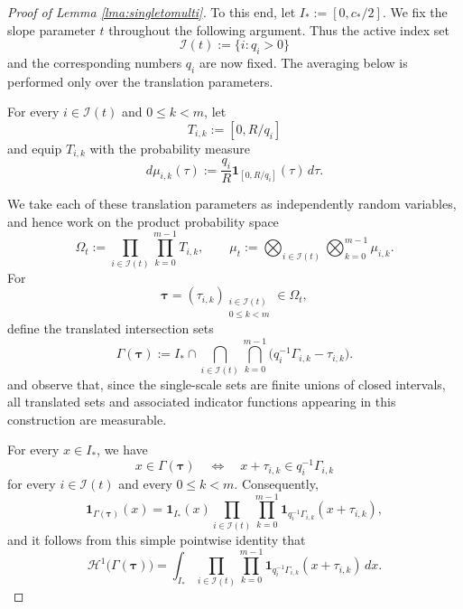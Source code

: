 \documentclass[12pt]{amsart}
\numberwithin{equation}{section}
\begin{document}
\begin{proof}[Proof of Lemma \ref{lma:singletomulti}]
To this end, let $I_*:=[0,c_*/2]$.  We fix the slope parameter $t$ throughout the following argument.  Thus the active index set
\[
\mathcal I(t):=\{i:q_i>0\}
\]
and the corresponding numbers $q_i$ are now fixed.  The averaging below is performed only over the translation parameters.

For every $i\in\mathcal I(t)$ and $0\leq k<m$, let
\[
T_{i,k}:=[0,R/q_i]
\]
and equip $T_{i,k}$ with the probability measure
\[
d\mu_{i,k}(\tau)
:=
\frac{q_i}{R}\mathbf 1_{[0,R/q_i]}(\tau)\,d\tau.
\]

We take each of these translation parameters as independently random variables, and hence work on the product probability space
\[
\Omega_t
:=
\prod_{i\in\mathcal I(t)}
\prod_{k=0}^{m-1}T_{i,k},
\qquad
\mu_t
:=
\bigotimes_{i\in\mathcal I(t)}
\bigotimes_{k=0}^{m-1}\mu_{i,k}.
\]
For
\[
\boldsymbol{\tau}
=
(\tau_{i,k})_{\substack{i\in\mathcal I(t)\\0\leq k<m}}
\in\Omega_t,
\]
define the translated intersection sets
\[
\Gamma(\boldsymbol{\tau})
:=
I_*\cap
\bigcap_{i\in\mathcal I(t)}
\bigcap_{k=0}^{m-1}
\bigl(q_i^{-1}\Gamma_{i,k}-\tau_{i,k}\bigr).
\]
and observe that, since the single-scale sets are finite unions of closed intervals, all translated sets and associated indicator functions appearing in this construction are measurable.  

For every $x\in I_*$, we have
\[
x\in\Gamma(\boldsymbol{\tau})
\quad\Longleftrightarrow\quad
x+\tau_{i,k}\in q_i^{-1}\Gamma_{i,k}
\]
for every $i\in\mathcal I(t)$ and every $0\leq k<m$.  Consequently,
\[
\mathbf 1_{\Gamma(\boldsymbol{\tau})}(x)
=
\mathbf 1_{I_*}(x)
\prod_{i\in\mathcal I(t)}
\prod_{k=0}^{m-1}
\mathbf 1_{q_i^{-1}\Gamma_{i,k}}
      (x+\tau_{i,k}),
\]
and it follows from this simple pointwise identity that
\[
\mathcal H^1\bigl(\Gamma(\boldsymbol{\tau})\bigr)
=
\int_{I_*}
\prod_{i\in\mathcal I(t)}
\prod_{k=0}^{m-1}
\mathbf 1_{q_i^{-1}\Gamma_{i,k}}
      (x+\tau_{i,k})\,dx.
\]


\end{proof}
\end{document}
